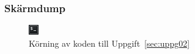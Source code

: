 \subsubsection{Skärmdump}
\begin{figure}[htbp]
    \centering
        \includegraphics[width=\linewidth]{img/02.png}
    \caption{Körning av koden till Uppgift~\ref{sec:uppg02}}
\label{fig:uppg02-screenshot}
\end{figure}

